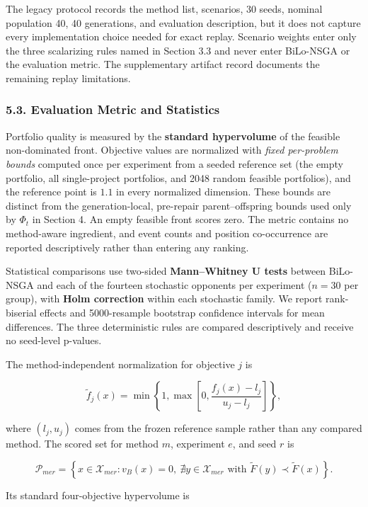 \documentclass[
]{article}
\begin{document}
The legacy protocol records the method list, scenarios, 30 seeds, nominal population 40, 40 generations, and evaluation description, but it does not capture every implementation choice needed for exact replay. Scenario weights enter only the three scalarizing rules named in Section 3.3 and never enter BiLo-NSGA or the evaluation metric. The supplementary artifact record documents the remaining replay limitations.

\subsubsection{5.3. Evaluation Metric and Statistics}\label{evaluation-metric-and-statistics}

Portfolio quality is measured by the \textbf{standard hypervolume} of the feasible non-dominated front. Objective values are normalized with \emph{fixed per-problem bounds} computed once per experiment from a seeded reference set (the empty portfolio, all single-project portfolios, and 2048 random feasible portfolios), and the reference point is \(1.1\) in every normalized dimension. These bounds are distinct from the generation-local, pre-repair parent--offspring bounds used only by \(\Phi_t\) in Section 4. An empty feasible front scores zero. The metric contains no method-aware ingredient, and event counts and position co-occurrence are reported descriptively rather than entering any ranking.

Statistical comparisons use two-sided \textbf{Mann--Whitney U tests} between BiLo-NSGA and each of the fourteen stochastic opponents per experiment (\(n=30\) per group), with \textbf{Holm correction} within each stochastic family. We report rank-biserial effects and 5000-resample bootstrap confidence intervals for mean differences. The three deterministic rules are compared descriptively and receive no seed-level p-values.

The method-independent normalization for objective \(j\) is

\[
\tilde f_j(x)=\min\!\left\{1,\max\!\left[0,\frac{f_j(x)-l_j}{u_j-l_j}\right]\right\},
\]

where \((l_j,u_j)\) comes from the frozen reference sample rather than any compared method. The scored set for method \(m\), experiment \(e\), and seed \(r\) is

\[
\mathcal{P}_{mer}=\left\{x\in\mathcal{X}_{mer}:v_B(x)=0,\ \nexists y\in\mathcal{X}_{mer}\text{ with }\tilde F(y)\prec\tilde F(x)\right\}.
\]

Its standard four-objective hypervolume is
\end{document}
